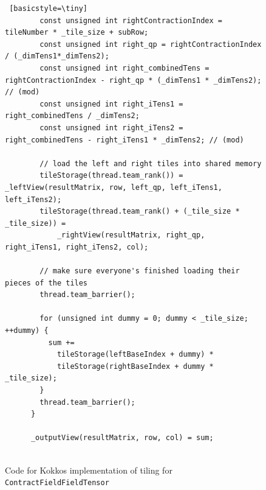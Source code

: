 \begin{figure}[H]
\begin{lstlisting} [basicstyle=\tiny]
        const unsigned int rightContractionIndex = tileNumber * _tile_size + subRow; 
        const unsigned int right_qp = rightContractionIndex / (_dimTens1*_dimTens2);
        const unsigned int right_combinedTens = rightContractionIndex - right_qp * (_dimTens1 * _dimTens2); // (mod)
        const unsigned int right_iTens1 = right_combinedTens / _dimTens2;
        const unsigned int right_iTens2 = right_combinedTens - right_iTens1 * _dimTens2; // (mod)

        // load the left and right tiles into shared memory
        tileStorage(thread.team_rank()) = _leftView(resultMatrix, row, left_qp, left_iTens1, left_iTens2);
        tileStorage(thread.team_rank() + (_tile_size * _tile_size)) =
            _rightView(resultMatrix, right_qp, right_iTens1, right_iTens2, col);

        // make sure everyone's finished loading their pieces of the tiles
        thread.team_barrier();

        for (unsigned int dummy = 0; dummy < _tile_size; ++dummy) {
          sum +=
            tileStorage(leftBaseIndex + dummy) *
            tileStorage(rightBaseIndex + dummy * _tile_size);
        }
        thread.team_barrier();
      }
      
      _outputView(resultMatrix, row, col) = sum;
      
 \end{lstlisting}
 \caption[Tiling implementation code]{Code for Kokkos implementation of tiling
     for \texttt{ContractFieldFieldTensor}}
\label{lst:CFFTTilingCode}
\end{figure}
 
 
